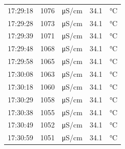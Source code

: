 \documentclass[11pt]{article}
\begin{document}
\begin{enumerate}
\begin{center}
\begin{tabular}{rrlrl}
17:29:18 & 1076 & μS/cm & 34.1 & °C\\
17:29:28 & 1073 & μS/cm & 34.1 & °C\\
17:29:39 & 1071 & μS/cm & 34.1 & °C\\
17:29:48 & 1068 & μS/cm & 34.1 & °C\\
17:29:58 & 1065 & μS/cm & 34.1 & °C\\
17:30:08 & 1063 & μS/cm & 34.1 & °C\\
17:30:18 & 1060 & μS/cm & 34.1 & °C\\
17:30:29 & 1058 & μS/cm & 34.1 & °C\\
17:30:38 & 1055 & μS/cm & 34.1 & °C\\
17:30:49 & 1052 & μS/cm & 34.1 & °C\\
17:30:59 & 1051 & μS/cm & 34.1 & °C\\
\end{tabular}
\end{center}


\end{enumerate}
\end{document}
